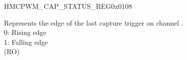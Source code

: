 \begin{register}{H}{MCPWM\_CAP\_STATUS\_REG}{0x0108}\label{regdesc:MCPWMCAPSTATUSREG}
%
%
%
%
\regnewline%
\begin{regdesc}\begin{reglist}
\label{fielddesc:MCPWMCAPNEDGE}\item [MCPWM\_CAP\regindex{n}\_EDGE] Represents the edge of the last capture trigger on channel .
\\0: Rising edge
\\1: Falling edge
\\(RO)
\end{reglist}\end{regdesc}
\end{register}


